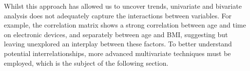 Whilst this approach has allowed us to uncover trends, univariate and bivariate analysis does not adequately capture the interactions between variables. For example, the correlation matrix shows a strong correlation between age and time on electronic devices, and separately between age and BMI, suggesting but leaving unexplored an interplay between these factors. To better understand potential interrelationships, more advanced multivariate techniques must be employed, which is the subject of the following section. 

